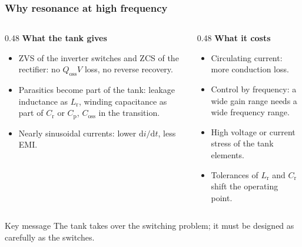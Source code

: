 \begin{frame}
	\frametitle{Why resonance at high frequency}
	\begin{columns}[T]
		\begin{column}{0.48\textwidth}
			\textbf{What the tank gives}
			\begin{itemize}
				\item ZVS of the inverter switches and ZCS of the rectifier: no $Q_\mathrm{oss}V$ loss, no reverse recovery.
				\item Parasitics become part of the tank: leakage inductance as $L_\mathrm{r}$, winding capacitance as part of $C_\mathrm{r}$ or $C_\mathrm{p}$, $C_\mathrm{oss}$ in the transition.
				\item Nearly sinusoidal currents: lower $\mathrm{d}i/\mathrm{d}t$, less EMI.
			\end{itemize}
		\end{column}
		\begin{column}{0.48\textwidth}
			\textbf{What it costs}
			\begin{itemize}
				\item Circulating current: more conduction loss.
				\item Control by frequency: a wide gain range needs a wide frequency range.
				\item High voltage or current stress of the tank elements.
				\item Tolerances of $L_\mathrm{r}$ and $C_\mathrm{r}$ shift the operating point.
			\end{itemize}
		\end{column}
	\end{columns}
	\begin{block}{Key message}
		The tank takes over the switching problem; it must be designed as carefully as the switches.
	\end{block}
\end{frame}

